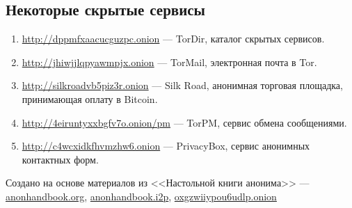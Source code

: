 \subsection*{Некоторые скрытые сервисы}
\begin{enumerate}
\item \url{http://dppmfxaacucguzpc.onion} --- TorDir, каталог скрытых сервисов.
\item \url{http://jhiwjjlqpyawmpjx.onion} --- TorMail, электронная почта в Tor.
\item \url{http://silkroadvb5piz3r.onion} --- Silk Road, анонимная торговая площадка, принимающая оплату в Bitcoin.
\item \url{http://4eiruntyxxbgfv7o.onion/pm} --- TorPM, сервис обмена сообщениями.
\item \url{http://c4wcxidkfhvmzhw6.onion} --- PrivacyBox, сервис анонимных контактных форм.
\end{enumerate}
\vfill
\scriptsize Создано на основе материалов из <<Настольной книги анонима>> --- \url{anonhandbook.org}, \url{anonhandbook.i2p}, \url{oxgzwiiypou6udlp.onion}
\normalsize
